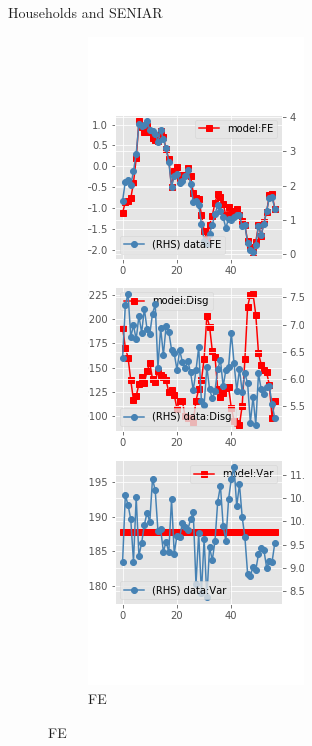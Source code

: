 \documentclass{beamer}
\begin{document}
\begin{frame}{Households and SENIAR}
	\begin{figure}[ht]
		\label{SENI_diag_SCE}
		\begin{subfigure}[b]{0.2\textwidth}
			\centering
			\caption{FE}
			\includegraphics[width=\textwidth, height = 0.8\textheight]{figuresDraft/sce_seni_est_diag0.png}

\end{subfigure}
\end{figure}
\end{frame}
\end{document}
